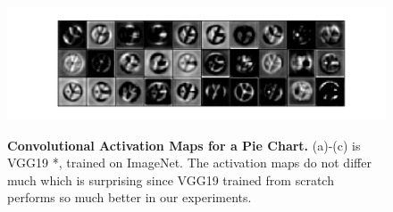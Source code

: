 \documentclass[journal]{vgtc}                %
\begin{document}
\begin{figure}[t]
{	  \includegraphics[width=.48\linewidth]{../gfx/ACTIVATIONMAPS/vgg_from_scratch_block3_conv3.pdf}
	}
	\hfill
	\hfill
  \caption{\textbf{Convolutional Activation Maps for a Pie Chart.} (a)-(c) is VGG19 *, trained on ImageNet. The activation maps do not differ much which is surprising since VGG19 trained from scratch performs so much better in our experiments.}
	\label{fig:activationmaps}
\end{figure}
\end{document}
